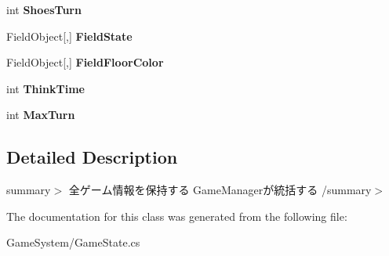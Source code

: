 \begin{DoxyCompactItemize}
\item 
int {\bfseries Shoes\+Turn}\hypertarget{classhoppin_1_1_game_system_1_1_game_state_af347f2c33f7960789f5c845ed8e6f13c}{}\label{classhoppin_1_1_game_system_1_1_game_state_af347f2c33f7960789f5c845ed8e6f13c}

\item 
Field\+Object\mbox{[},\mbox{]} {\bfseries Field\+State}\hypertarget{classhoppin_1_1_game_system_1_1_game_state_a2a28e86ec245b55fb6120055e5299cd7}{}\label{classhoppin_1_1_game_system_1_1_game_state_a2a28e86ec245b55fb6120055e5299cd7}

\item 
Field\+Object\mbox{[},\mbox{]} {\bfseries Field\+Floor\+Color}\hypertarget{classhoppin_1_1_game_system_1_1_game_state_aeb3113972aa024e7929806a6015bf8f7}{}\label{classhoppin_1_1_game_system_1_1_game_state_aeb3113972aa024e7929806a6015bf8f7}

\item 
int {\bfseries Think\+Time}\hypertarget{classhoppin_1_1_game_system_1_1_game_state_a13573b010e37d7bb31c8fef8f46b7171}{}\label{classhoppin_1_1_game_system_1_1_game_state_a13573b010e37d7bb31c8fef8f46b7171}

\item 
int {\bfseries Max\+Turn}\hypertarget{classhoppin_1_1_game_system_1_1_game_state_ae85e1930a8705706c34e831ea832f6d0}{}\label{classhoppin_1_1_game_system_1_1_game_state_ae85e1930a8705706c34e831ea832f6d0}

\end{DoxyCompactItemize}


\subsection{Detailed Description}
summary$>$ 全ゲーム情報を保持する Game\+Managerが統括する /summary$>$ 

The documentation for this class was generated from the following file\+:\begin{DoxyCompactItemize}
\item 
Game\+System/Game\+State.\+cs\end{DoxyCompactItemize}
